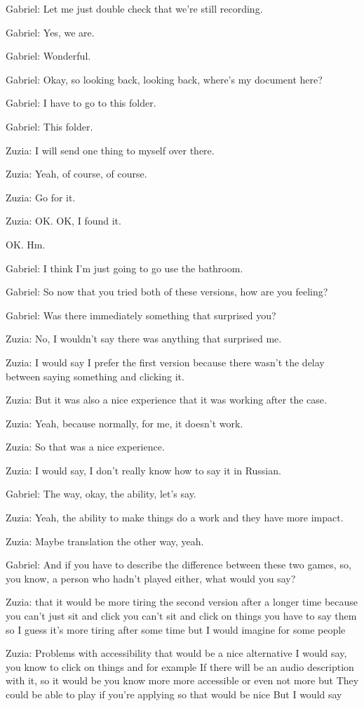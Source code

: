 Gabriel: Let me just double check that we're still recording.

Gabriel: Yes, we are.

Gabriel: Wonderful.

Gabriel: Okay, so looking back, looking back, where's my document here?

Gabriel: I have to go to this folder.

Gabriel: This folder.

Zuzia: I will send one thing to myself over there.

Zuzia: Yeah, of course, of course.

Zuzia: Go for it.

Zuzia: OK. OK, I found it.

OK. Hm.

Gabriel: I think I'm just going to go use the bathroom.

Gabriel: So now that you tried both of these versions, how are you feeling?

Gabriel: Was there immediately something that surprised you?

Zuzia: No, I wouldn't say there was anything that surprised me.

Zuzia: I would say I prefer the first version because there wasn't the delay between saying something and clicking it.

Zuzia: But it was also a nice experience that it was working after the case.

Zuzia: Yeah, because normally, for me, it doesn't work.

Zuzia: So that was a nice experience.

Zuzia: I would say, I don't really know how to say it in Russian.

Gabriel: The way, okay, the ability, let's say.

Zuzia: Yeah, the ability to make things do a work and they have more impact.

Zuzia: Maybe translation the other way, yeah.

Gabriel: And if you have to describe the difference between these two games, so, you know, a person who hadn't played either, what would you say?

Zuzia: that it would be more tiring the second version after a longer time because you can't just sit and click you can't sit and click on things you have to say them so I guess it's more tiring after some time but I would imagine for some people

Zuzia: Problems with accessibility that would be a nice alternative I would say, you know to click on things and for example If there will be an audio description with it, so it would be you know more more accessible or even not more but They could be able to play if you're applying so that would be nice But I would say

